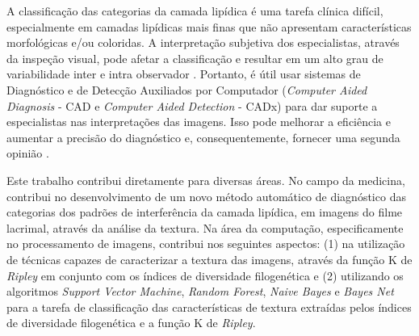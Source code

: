 A classificação das categorias da camada lipídica é uma tarefa clínica difícil, especialmente em camadas lipídicas mais finas que não apresentam características morfológicas e/ou coloridas. A interpretação subjetiva dos especialistas, através da inspeção visual, pode afetar a classificação e resultar em um alto grau de variabilidade inter e intra observador \cite{garcia2013new}. Portanto, é útil usar sistemas de Diagnóstico e de Detecção Auxiliados por Computador (\textit{Computer Aided Diagnosis} - CAD e \textit{Computer Aided Detection} - CADx) para dar suporte a especialistas nas interpretações das imagens. Isso pode melhorar a eficiência e aumentar a precisão do diagnóstico e, consequentemente, fornecer uma segunda opinião \cite{doi2007computer}.



Este trabalho contribui diretamente para diversas áreas. No campo da medicina, contribui no desenvolvimento de um novo método automático de diagnóstico das categorias dos padrões de interferência da camada lipídica, em imagens do filme lacrimal, através da análise da textura. Na área da computação, especificamente no processamento de imagens, contribui nos seguintes aspectos: (1) na utilização de técnicas capazes de caracterizar a textura das imagens, através da função K de \textit{Ripley} em conjunto com os índices de diversidade filogenética e (2) utilizando os algoritmos \textit{Support Vector Machine}, \textit{Random Forest}, \textit{Naive Bayes} e \textit{Bayes Net} para a tarefa de classificação das características de textura extraídas pelos índices de diversidade filogenética e a função K de \textit{Ripley}.

